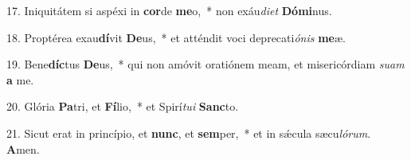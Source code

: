 17. Iniquitátem si aspéxi in \textbf{cor}de \textbf{me}o,~*  non exáu\textit{di}\textit{et} \textbf{Dó}\textbf{mi}nus.\

18. Proptérea exau\textbf{dí}vit \textbf{De}us,~*  et atténdit voci deprecati\textit{ó}\textit{nis} \textbf{me}æ.\

19. Bene\textbf{díc}tus \textbf{De}us,~*  qui non amóvit oratiónem meam, et misericórdiam \textit{su}\textit{am} \textbf{a} me.\

20. Glória \textbf{Pa}tri, et \textbf{Fí}lio,~*  et Spirí\textit{tu}\textit{i} \textbf{Sanc}to.\

21. Sicut erat in princípio, et \textbf{nunc}, et \textbf{sem}per,~*  et in sǽcula sæcu\textit{ló}\textit{rum}. \textbf{A}men.\

